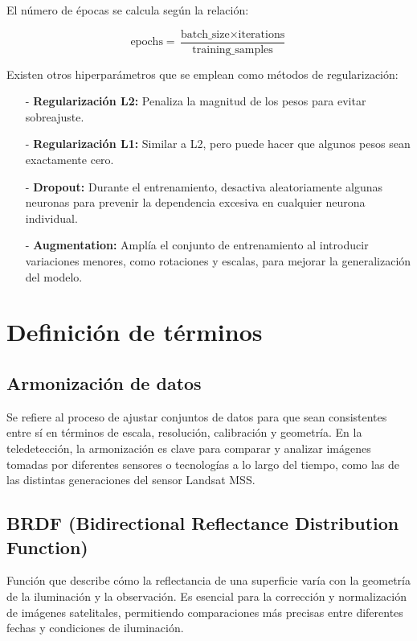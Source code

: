                     El número de épocas se calcula según la relación:
                    
                    \begin{equation}
                        \text{epochs} = \frac{\text{batch\_size} \times \text{iterations}}{\text{training\_samples}}
                    \end{equation}
                    
                    Existen otros hiperparámetros que se emplean como métodos de regularización:
                    
                    \begin{itemize}
                        \item[-] \textbf{Regularización L2:} Penaliza la magnitud de los pesos para evitar sobreajuste.
                        \item[-] \textbf{Regularización L1:} Similar a L2, pero puede hacer que algunos pesos sean exactamente cero.
                        \item[-] \textbf{Dropout:} Durante el entrenamiento, desactiva aleatoriamente algunas neuronas para prevenir la dependencia excesiva en cualquier neurona individual.
                        \item[-] \textbf{Augmentation:} Amplía el conjunto de entrenamiento al introducir variaciones menores, como rotaciones y escalas, para mejorar la generalización del modelo.
                    \end{itemize}

        \section{Definición de términos}
                       
            \subsection{Armonización de datos}
                Se refiere al proceso de ajustar conjuntos de datos para que sean consistentes entre sí en términos de escala, resolución, calibración y geometría. En la teledetección, la armonización es clave para comparar y analizar imágenes tomadas por diferentes sensores o tecnologías a lo largo del tiempo, como las de las distintas generaciones del sensor Landsat MSS.
                
            \subsection{BRDF (Bidirectional Reflectance Distribution Function)}
                Función que describe cómo la reflectancia de una superficie varía con la geometría de la iluminación y la observación. Es esencial para la corrección y normalización de imágenes satelitales, permitiendo comparaciones más precisas entre diferentes fechas y condiciones de iluminación.
            

